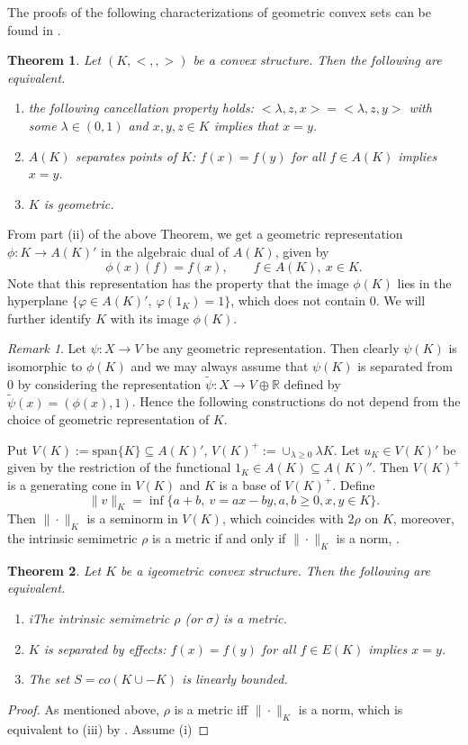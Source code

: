 \documentclass[12pt]{article}
\newtheorem{thm}{Theorem}
\newcommand{\<}{\langle}
\theoremstyle{remark}
\newtheorem{rem}{Remark}
\begin{document}
The proofs of the following characterizations of geometric convex sets can be found in \cite{stone,gudder,fritz}.

\begin{thm} Let $(K,<,,>)$ be a convex structure. Then the following are equivalent.
\begin{enumerate}
\item[(i)] the following cancellation property holds: $<\lambda,z,x>=<\lambda,z,y>$ with some $\lambda \in (0,1)$ and  $x,y,z\in K$  implies that $x=y$.
\item[(ii)] $A(K)$ separates points of $K$: $f(x)=f(y)$ for all $f\in A(K)$ implies $x=y$.
\item[(iii)] $K$ is geometric.
\end{enumerate}


\end{thm}

From part (ii) of the above Theorem, we get a geometric representation $\phi: K\to A(K)'$ in the algebraic dual of $A(K)$, given by
\[
\phi(x)(f)=f(x),\qquad f\in A(K),\ x\in K.
\]
Note that this representation has the property that the image $\phi(K)$  lies in the hyperplane $\{ \varphi\in A(K)',\ \varphi(1_K)=1\}$, which does not contain 0. 
We will further identify $K$ with its image $\phi(K)$. 

 \begin{rem} Let $\psi:X\to V$ be  any geometric representation. Then clearly $\psi(K)$ is isomorphic to $\phi(K)$ and we may always assume that $\psi(K)$ is separated from 0 by considering the representation  $\tilde \psi:X\to V\oplus \mathbb R$  defined by $\tilde \psi(x)=(\phi(x),1)$. Hence the following constructions do not depend from the choice of geometric representation of $K$.

\end{rem}

Put  $V(K):=\mathrm{span}\{K\}\subseteq A(K)'$, $V(K)^+:=\cup_{\lambda\ge 0} \lambda K$. Let $u_K\in V(K)'$ be given by the restriction of the functional $1_K\in A(K)\subseteq A(K)''$. Then $V(K)^+$ is a generating cone in $V(K)$ and $K$ is a base of $V(K)^+$. Define
\[
\|v\|_K=\inf\{a+b,\ v=ax-by, a,b\ge 0, x,y\in K\}.
\] 
Then $\|\cdot\|_K$ is a seminorm in $V(K)$, which coincides with $2\rho$ on $K$, moreover, the intrinsic semimetric $\rho$ is a metric if and only if $\|\cdot\|_K$ is a norm, \cite{gudder}.  

\begin{thm} Let $K$ be a igeometric convex structure. Then the following are equivalent.
\begin{enumerate}
\item[(i)] iThe intrinsic semimetric  $\rho$ (or $\sigma$) is a metric.
\item[(ii)] $K$ is separated by effects: $f(x)=f(y)$ for all $f\in E(K)$ implies $x=y$.
\item[(iii)] The set $S=co(K\cup -K)$ is linearly bounded.

\end{enumerate}




\end{thm}



\begin{proof} As mentioned above, $\rho$ is a metric iff $\|\cdot\|_K$ is a norm, which is equivalent to (iii) by \cite{ellis}. Assume (i)



\end{proof}
\end{document}

